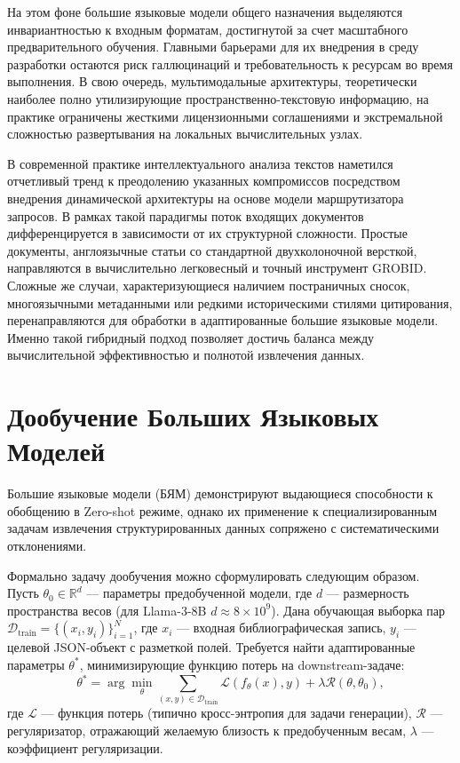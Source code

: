 На этом фоне большие языковые модели общего назначения выделяются инвариантностью к входным форматам, достигнутой за счет масштабного предварительного обучения. Главными барьерами для их внедрения в среду разработки остаются риск галлюцинаций и требовательность к ресурсам во время выполнения. В свою очередь, мультимодальные архитектуры, теоретически наиболее полно утилизирующие пространственно-текстовую информацию, на практике ограничены жесткими лицензионными соглашениями и экстремальной сложностью развертывания на локальных вычислительных узлах.

В современной практике интеллектуального анализа текстов наметился отчетливый тренд к преодолению указанных компромиссов посредством внедрения динамической архитектуры на основе модели маршрутизатора запросов. В рамках такой парадигмы поток входящих документов дифференцируется в зависимости от их структурной сложности. Простые документы, англоязычные статьи со стандартной двухколоночной версткой, направляются в вычислительно легковесный и точный инструмент GROBID. Сложные же случаи, характеризующиеся наличием постраничных сносок, многоязычными метаданными или редкими историческими стилями цитирования, перенаправляются для обработки в адаптированные большие языковые модели. Именно такой гибридный подход позволяет достичь баланса между вычислительной эффективностью и полнотой извлечения данных.

\section{Дообучение Больших Языковых Моделей}

Большие языковые модели (БЯМ) демонстрируют выдающиеся способности к обобщению в Zero-shot режиме, однако их применение к специализированным задачам извлечения структурированных данных сопряжено с систематическими отклонениями. 

Формально задачу дообучения можно сформулировать следующим образом\cite{hu2022lora}. Пусть $\theta_0 \in \mathbb{R}^d$ --- параметры предобученной модели, где $d$ --- размерность пространства весов (для Llama-3-8B $d \approx 8 \times 10^9$). Дана обучающая выборка пар $\mathcal{D}_{\text{train}} = \{(x_i, y_i)\}_{i=1}^N$, где $x_i$ --- входная библиографическая запись, $y_i$ --- целевой JSON-объект с разметкой полей. Требуется найти адаптированные параметры $\theta^*$, минимизирующие функцию потерь на downstream-задаче:
\begin{equation}
\theta^* = \arg\min_{\theta} \sum_{(x,y) \in \mathcal{D}_{\text{train}}} \mathcal{L}\left(f_{\theta}(x), y\right) + \lambda \mathcal{R}(\theta, \theta_0),
\end{equation}
где $\mathcal{L}$ --- функция потерь (типично кросс-энтропия для задачи генерации), $\mathcal{R}$ --- регуляризатор, отражающий желаемую близость к предобученным весам, $\lambda$ --- коэффициент регуляризации.

